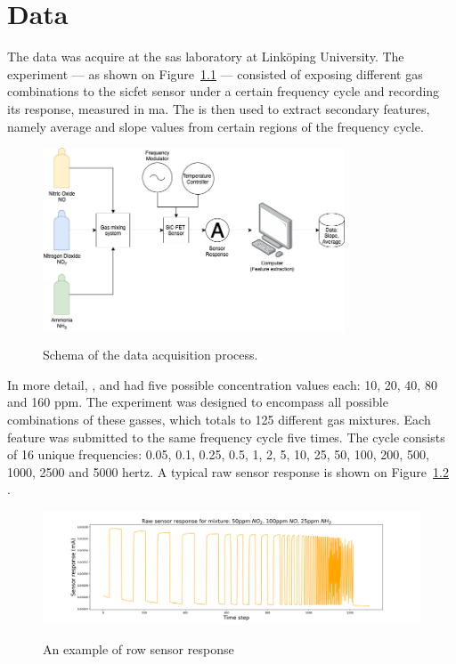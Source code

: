 \chapter{Data}
\label{cha:data}

The data was acquire at the \acrfull{sas} laboratory at Linköping University. The experiment --- as shown on Figure~\ref{fig:experimental-setup} --- consisted of exposing different gas combinations to the \acrshort{sicfet} sensor under a certain frequency cycle and recording its response, measured in \acrfull{ma}. The is then used to extract secondary features, namely average and slope values from certain regions of the frequency cycle.

\begin{figure}[!htb]
	\centering
	\includegraphics[width=0.8\textwidth]{../figures/experimental-setup.png}
	\label{fig:experimental-setup}
	\caption{Schema of the data acquisition process.}
\end{figure}

In more detail, ,  and  had five possible concentration values each: 10, 20, 40, 80 and 160 \acrfull{ppm}. The experiment was designed to encompass all possible combinations of these gasses, which totals to 125 different gas mixtures. Each feature was submitted to the same frequency cycle five times. The cycle consists of 16 unique frequencies: 0.05, 0.1, 0.25, 0.5, 1, 2, 5, 10, 25, 50, 100, 200, 500, 1000, 2500 and 5000 \acrfull{hertz}. A typical raw sensor response is shown on Figure~\ref{fig:raw} .

\begin{figure}[!htb]
	\centering
	\includegraphics[width=1.2\textwidth]{../figures/raw-response.png}
	\label{fig:raw}
	\caption{An example of row sensor response}
\end{figure}


